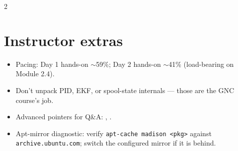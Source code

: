 \documentclass[a4paper,9pt,landscape]{extarticle}
\begin{document}
\begin{multicols*}{2}
\ifinstructor
\section*{Instructor extras}
\begin{itemize}
  \item Pacing: Day 1 hands-on $\sim$59\%; Day 2 hands-on $\sim$41\% (load-bearing on Module 2.4).
  \item Don't unpack PID, EKF, or spool-state internals --- those are the GNC course's job.
  \item Advanced pointers for Q\&A: \siblingplane, \siblingquadplane.
  \item Apt-mirror diagnostic: verify \texttt{apt-cache madison <pkg>} against \texttt{archive.ubuntu.com}; switch the configured mirror if it is behind.
\end{itemize}
\fi

\end{multicols*}
\end{document}
